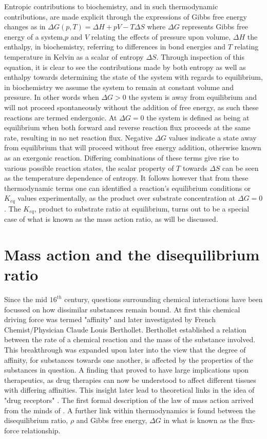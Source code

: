 Entropic contributions to biochemistry, and in such thermodynamic contributions, are made explicit through the expressions of Gibbs free energy changes as in $\Delta G(p,T)=\Delta H+pV-T\Delta S$ where $\Delta G$ represents Gibbs free energy of a system,$p$ and $V$ relating the effects of pressure upon volume, $\Delta H$ the enthalpy, in biochemistry, referring to differences in bond energies and $T$ relating temperature in Kelvin as a scalar of entropy $\Delta S$. Through inspection of this equation, it is clear to see the contributions made by both entropy as well as enthalpy towards determining the state of the system with regards to equilibrium, in biochemistry we assume the system to remain at constant volume and pressure. In other words when $\Delta G > 0$ the system is away from equilibrium and will not proceed spontaneously without the addition of free energy, as such these reactions are termed endergonic. At $\Delta G = 0$ the system is defined as being at equilibrium when both forward and reverse reaction flux proceeds at the same rate, resulting in no net reaction flux. Negative $\Delta G$ values indicate a state away from equilibrium that will proceed without free energy addition, otherwise known as an exergonic reaction. Differing combinations of these terms give rise to various possible reaction states, the scalar property of $T$ towards $\Delta S$ can be seen as the temperature dependence of entropy. It follows however that from these thermodynamic terms one can identified a reaction's equilibrium conditions or $K_{eq}$ values experimentally, as the product over substrate concentration at $\Delta G =0$. The $K_{eq}$, product to substrate ratio at equilibrium, turns out to be a special case of what is known as the mass action ratio, as will be discussed.

\section{Mass action and the disequilibrium ratio}
Since the mid $16^{th}$ century, questions surrounding chemical interactions have been focussed on how dissimilar substances remain bound. At first this chemical driving force was termed "affinity" and later investigated by French Chemist/Physician Claude Louis Berthollet. Berthollet established a relation between the rate of a chemical reaction and the mass of the substance involved. This breakthrough was expanded upon later into the view that the degree of affinity, for substances towards one another, is affected by the properties of the substances in question. A finding that proved to have large implications upon therapeutics, as drug therapies can now be understood to affect different tissues with differing affinities. This insight later lead to theoretical links in the idea of "drug receptors" \cite{Ferner2016,Voit2015}. The first formal description of the law of mass action arrived from the minds of \citeauthor{Waage1986}. A further link within thermodynamics is found between the disequilibrium ratio, $\rho$ and Gibbs free energy, $\Delta G$ in what is known as the flux-force relationship.

